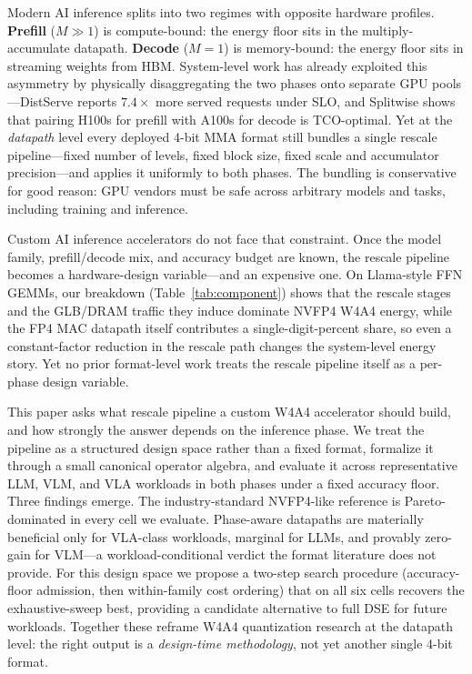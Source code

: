 \documentclass[conference]{IEEEtran}
\begin{document}
Modern AI inference splits into two regimes with opposite hardware
profiles.  \textbf{Prefill} ($M{\gg}1$) is compute-bound: the energy
floor sits in the multiply-accumulate datapath.  \textbf{Decode}
($M{=}1$) is memory-bound: the energy floor sits in streaming
weights from HBM.  System-level work has already exploited this
asymmetry by physically disaggregating the two phases onto separate
GPU pools---DistServe \cite{distserve} reports $7.4\!\times$ more
served requests under SLO, and Splitwise \cite{splitwise} shows
that pairing H100s for prefill with A100s for decode is
TCO-optimal.  Yet at the \emph{datapath} level every deployed
4-bit MMA format \cite{nvfp4,mxfp4,gptq,hifloat4,axe,mixpe,isfiner,m2xfp,mxplus}
still bundles a single rescale pipeline---fixed number of levels,
fixed block size, fixed scale and accumulator precision---and
applies it uniformly to both phases.  The bundling is conservative
for good reason: GPU vendors must be safe across arbitrary models and tasks, including training and inference.

Custom AI inference
accelerators do not face that constraint.  Once the model family,
prefill/decode mix, and accuracy budget are known, the rescale
pipeline becomes a hardware-design variable---and an expensive
one.  On Llama-style FFN GEMMs, our breakdown
(Table~\ref{tab:component}) shows that the rescale stages and the
GLB/DRAM traffic they induce dominate NVFP4 W4A4 energy, while
the FP4 MAC datapath itself contributes a single-digit-percent
share, so even a constant-factor reduction in the rescale path
changes the system-level energy story.  Yet no prior
format-level work treats the rescale pipeline itself as a
per-phase design variable.

This paper asks what rescale pipeline a custom W4A4
accelerator should build, and how strongly the answer depends on
the inference phase.  We treat the pipeline as a structured design
space rather than a fixed format, formalize it through a small
canonical operator algebra, and evaluate it across representative
LLM, VLM, and VLA workloads in both phases under a fixed accuracy
floor.  Three findings emerge.  The industry-standard NVFP4-like
reference is Pareto-dominated in every cell we evaluate.
Phase-aware datapaths are materially beneficial only for
VLA-class workloads, marginal for LLMs, and provably zero-gain for
VLM---a workload-conditional verdict the format literature does
not provide.  For this design space we propose a two-step search procedure
(accuracy-floor admission, then within-family cost ordering) that
on all six cells recovers the exhaustive-sweep best, providing a
candidate alternative to full DSE for future workloads.  Together these reframe W4A4 quantization
research at the datapath level: the right output is a
\emph{design-time methodology}, not yet another single 4-bit
format.
\end{document}
